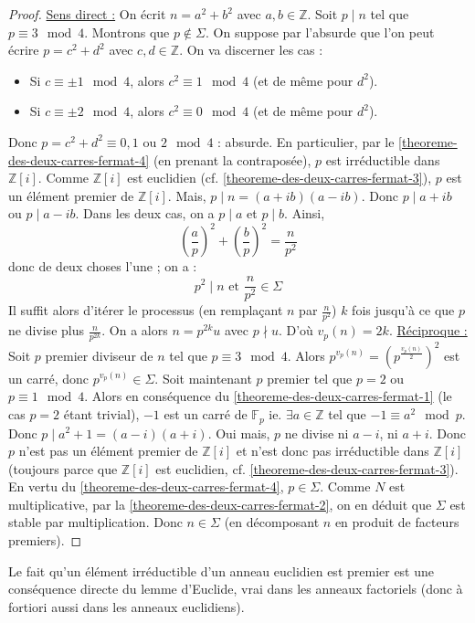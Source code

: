   \begin{proof}
    \uline{Sens direct :} On écrit $n = a^2 + b^2$ avec $a, b \in \mathbb{Z}$. Soit $p \mid n$ tel que $p \equiv 3 \mod 4$. Montrons que $p \notin \Sigma$. On suppose par l'absurde que l'on peut écrire $p = c^2 + d^2$ avec $c, d \in \mathbb{Z}$. On va discerner les cas :
    \begin{itemize}
      \item Si $c \equiv \pm 1 \mod 4$, alors $c^2 \equiv 1 \mod 4$ (et de même pour $d^2$).
      \item Si $c \equiv \pm 2 \mod 4$, alors $c^2 \equiv 0 \mod 4$ (et de même pour $d^2$).
    \end{itemize}
    Donc $p = c^2 + d^2 \equiv 0, 1 \text{ ou } 2 \mod 4$ : absurde. En particulier, par le \cref{theoreme-des-deux-carres-fermat-4} (en prenant la contraposée), $p$ est irréductible dans $\mathbb{Z}[i]$. Comme $\mathbb{Z}[i]$ est euclidien (cf. \cref{theoreme-des-deux-carres-fermat-3}), $p$ est un élément premier de $\mathbb{Z}[i]$. Mais, $p \mid n = (a+ib)(a-ib)$. Donc $p \mid a+ib$ ou $p \mid a-ib$. Dans les deux cas, on a $p \mid a$ et $p \mid b$. Ainsi,
    \[ \left( \frac{a}{p} \right)^2 + \left( \frac{b}{p} \right)^2 = \frac{n}{p^2} \]
    donc de deux choses l'une ; on a :
    \[ p^2 \mid n \text{ et } \frac{n}{p^2} \in \Sigma \]
    Il suffit alors d'itérer le processus (en remplaçant $n$ par $\frac{n}{p^2}$) $k$ fois jusqu'à ce que $p$ ne divise plus $\frac{n}{p^{2k}}$. On a alors $n = p^{2k} u$ avec $p \nmid u$. D'où $v_p(n) = 2k$.
    \newpar
    \uline{Réciproque :} Soit $p$ premier diviseur de $n$ tel que $p \equiv 3 \mod 4$. Alors $p^{v_p(n)} = \left( p^{\frac{v_p(n)}{2}} \right)^2$ est un carré, donc $p^{v_p(n)} \in \Sigma$.
    \newpar
    Soit maintenant $p$ premier tel que $p = 2$ ou $p \equiv 1  \mod 4$. Alors en conséquence du \cref{theoreme-des-deux-carres-fermat-1} (le cas $p = 2$ étant trivial), $-1$ est un carré de $\mathbb{F}_p$ ie. $\exists a \in \mathbb{Z}$ tel que $-1 \equiv a^2 \mod p$. Donc $p \mid a^2 + 1 = (a-i)(a+i)$. Oui mais, $p$ ne divise ni $a-i$, ni $a+i$. Donc $p$ n'est pas un élément premier de $\mathbb{Z}[i]$ et n'est donc pas irréductible dans $\mathbb{Z}[i]$ (toujours parce que $\mathbb{Z}[i]$ est euclidien, cf. \cref{theoreme-des-deux-carres-fermat-3}). En vertu du \cref{theoreme-des-deux-carres-fermat-4}, $p \in \Sigma$.
    \newpar
    Comme $N$ est multiplicative, par la \cref{theoreme-des-deux-carres-fermat-2}, on en déduit que $\Sigma$ est stable par multiplication. Donc $n \in \Sigma$ (en décomposant $n$ en produit de facteurs premiers).
  \end{proof}


  \begin{remark}
    Le fait qu'un élément irréductible d'un anneau euclidien est premier est une conséquence directe du lemme d'Euclide, vrai dans les anneaux factoriels (donc à fortiori aussi dans les anneaux euclidiens).
  \end{remark}

